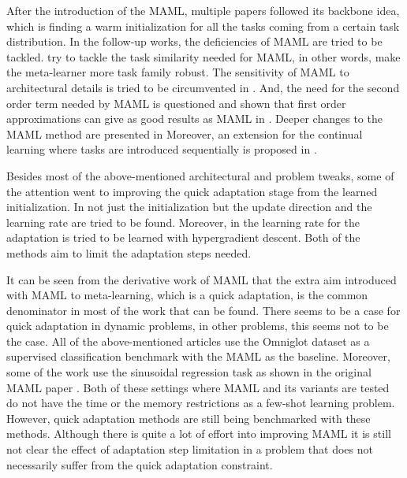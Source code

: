 After the introduction of the MAML, multiple papers followed its backbone idea, which is finding a warm initialization for all the tasks coming from a certain task distribution. In the follow-up works, the deficiencies of MAML are tried to be tackled. \cite{flennerhag2019, collins2020} try to tackle the task similarity needed for MAML, in other words, make the meta-learner more task family robust. The sensitivity of MAML to architectural details is tried to be circumvented in \cite{antoniou2019}. And, the need for the second order term needed by MAML is questioned and shown that first order approximations can give as good results as MAML in \cite{nichol2018}. Deeper changes to the MAML method are presented in \cite{grant2018} Moreover, an extension for the continual learning where tasks are introduced sequentially is proposed in \cite{finn2019, rajasegaran2020}. 

Besides most of the above-mentioned architectural and problem tweaks, some of the attention went to improving the quick adaptation stage from the learned initialization. In \cite{li2017} not just the initialization but the update direction and the learning rate are tried to be found. Moreover, in \cite{behl2019} the learning rate for the adaptation is tried to be learned with hypergradient descent. Both of the methods aim to limit the adaptation steps needed. 

It can be seen from the derivative work of MAML that the extra aim introduced with MAML to meta-learning, which is a quick adaptation, is the common denominator in most of the work that can be found. There seems to be a case for quick adaptation in dynamic problems, in other problems, this seems not to be the case. All of the above-mentioned articles use the Omniglot dataset \cite{lake2019} as a supervised classification benchmark with the MAML as the baseline. Moreover, some of the work use the sinusoidal regression task as shown in the original MAML paper \cite{finn2017}. Both of these settings where MAML and its variants are tested do not have the time or the memory restrictions as a few-shot learning problem. However, quick adaptation methods are still being benchmarked with these methods. Although there is quite a lot of effort into improving MAML it is still not clear the effect of adaptation step limitation in a problem that does not necessarily suffer from the quick adaptation constraint.


